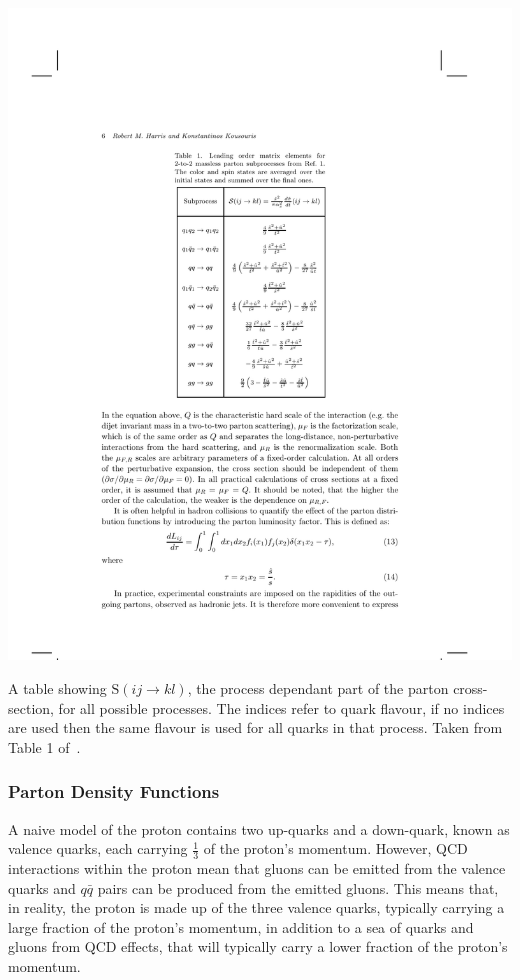 \begin{table}[!hbt]
  \begin{center}
    \includegraphics[width=0.7\linewidth, angle=0]{figs/Theory/qcd_dijet_stable.pdf}
  \end{center}
  \caption[A table showing $\text{S}(ij \to kl)$, the process dependant part of the parton cross-section, for all possible processes.
    The indices refer to quark flavour, if no indices are used then the same flavour is used for all quarks in that process.]
          {A table showing $\text{S}(ij \to kl)$, the process dependant part of the parton cross-section, for all possible processes.
            The indices refer to quark flavour, if no indices are used then the same flavour is used for all quarks in that process. Taken from Table 1 of~\cite{theo-dijet_harris}.}
  \label{tab:theo-qcd_dijet_s}
\end{table}

\newpage
\subsubsection{Parton Density Functions}
\label{sec:theo-qcd_pdf}

A naive model of the proton contains two up-quarks and a down-quark,
known as valence quarks, each carrying $\frac{1}{3}$ of the proton's momentum.
However, QCD interactions within the proton mean that gluons can be emitted from the valence quarks
and $q\bar{q}$ pairs can be produced from the emitted gluons.
This means that, in reality, the proton is made up of the three valence quarks, typically carrying a large fraction of the proton's momentum,
in addition to a sea of quarks and gluons from QCD effects, that will typically carry a lower fraction of the proton's momentum.

